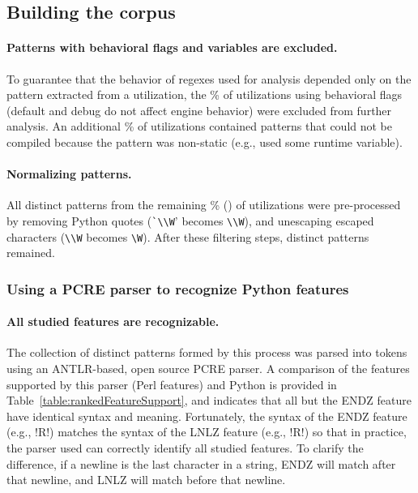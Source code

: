 \subsection{Building the corpus}
\paragraph{Patterns with behavioral flags and variables are excluded.} To guarantee that the behavior of regexes used for analysis depended only on the pattern extracted from a utilization, the \%  of utilizations using behavioral flags (default and debug do not affect engine behavior) were excluded from further analysis.  An additional \% of utilizations contained patterns that could not be compiled because the pattern was non-static (e.g., used some runtime variable).

\paragraph{Normalizing patterns.} All distinct patterns from the remaining \% () of utilizations were pre-processed by removing Python quotes (\verb!`\\W!' becomes \verb!\\W!), and unescaping escaped characters (\verb!\\W! becomes \verb!\W!).  After these filtering steps,  distinct patterns remained.

\subsubsection{Using a PCRE parser to recognize Python features}
\paragraph{All studied features are recognizable.} The collection of distinct patterns formed by this process was parsed into tokens using an ANTLR-based, open source PCRE parser.  A comparison of the features supported by this parser (Perl features) and Python is provided in Table~\ref{table:rankedFeatureSupport}, and indicates that all but the ENDZ feature have identical syntax and meaning.  Fortunately, the syntax of the ENDZ feature (e.g., \cverb!R\Z!) matches the syntax of the LNLZ feature (e.g., \cverb!R\Z!) so that in practice, the parser used can correctly identify all studied features.  To clarify the difference, if a newline is the last character in a string, ENDZ will match after that newline, and LNLZ will match before that newline.

